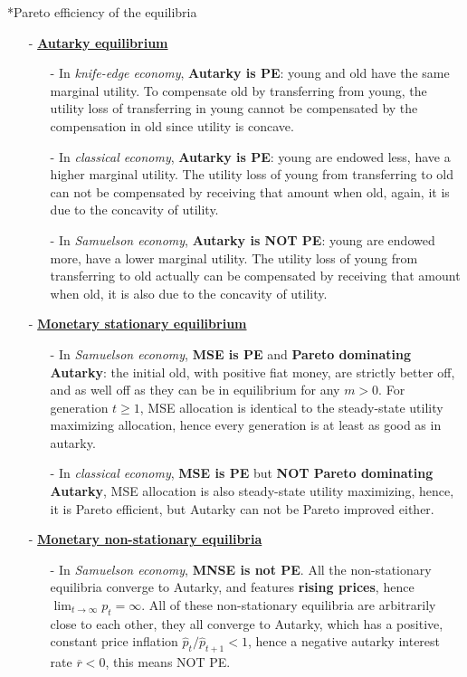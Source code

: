 \documentclass[10pt,landscape,a4paper]{article}
\makeatletter
\let\bar\overline
\renewcommand{\subsection}{\@startsection{subsection}{1}{0mm}{.2ex}{.2ex}{\bfseries}}
\makeatother
\begin{document}
\begin{multicols*}{4}
\subsection*{Pareto efficiency of the equilibria}
\begin{itemize}
    \item[-] \underline{\textbf{Autarky equilibrium}} 
    \begin{itemize}
        \item[-] In \textit{knife-edge economy}, \textbf{Autarky is PE}: young and old have the same marginal utility. To compensate old by transferring from young, the utility loss of transferring in young cannot be compensated by the compensation in old since utility is concave.
        \item[-] In \textit{classical economy}, \textbf{Autarky is PE}: young are endowed less, have a higher marginal utility. The utility loss of young from transferring to old can not be compensated by receiving that amount when old, again, it is due to the concavity of utility.
        \item[-] In \textit{Samuelson economy}, \textbf{Autarky is NOT PE}: young are endowed more, have a lower marginal utility. The utility loss of young from transferring to old actually can be compensated by receiving that amount when old, it is also due to the concavity of utility.
    \end{itemize}
    
    \item[-] \underline{\textbf{Monetary stationary equilibrium}}
    \begin{itemize}
        \item[-] In \textit{Samuelson economy}, \textbf{MSE is PE} and \textbf{Pareto dominating Autarky}: the initial old, with positive fiat money, are strictly better off, and as well off as they can be in equilibrium for any $m>0$. For generation $t\geq 1$, MSE allocation is identical to the steady-state utility maximizing allocation, hence every generation is at least as good as in autarky.
        
        \item[-] In \textit{classical economy}, \textbf{MSE is PE} but \textbf{NOT Pareto dominating Autarky}, MSE allocation is also steady-state utility maximizing, hence, it is Pareto efficient, but Autarky can not be Pareto improved either.
    \end{itemize}
    \item[-] \underline{\textbf{Monetary non-stationary equilibria}}
    \begin{itemize}
        \item[-] In \textit{Samuelson economy}, \textbf{MNSE is not PE}. All the non-stationary equilibria converge to Autarky, and features \textbf{rising prices}, hence $\lim_{t\rightarrow\infty}p_t=\infty$. All of these non-stationary equilibria are arbitrarily close to each other, they all converge to Autarky, which has a positive, constant price inflation $\hat{p}_t/\hat{p}_{t+1}<1$, hence a negative autarky interest rate $\bar{r}<0$, this means NOT PE.
        

\end{itemize}
\end{itemize}
\end{multicols*}
\end{document}
